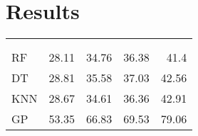 \section{Results}
\begin{margintable}
	\centering
	\begin{tabularx}{1\marginparwidth}{Xd{2.1}d{2.1}d{1.1}d{1.1}}
		\toprule
		&
		&    
		 &
		 &
		 \\
		\\
		\midrule
		RF & 28.11 & 34.76 &36.38 & 41.4 \\ 
		DT & 28.81 & 35.58 &37.03 & 42.56 \\ 
		KNN& 28.67 & 34.61 &36.36 & 42.91 \\ 
		GP & 53.35 & 66.83 &69.53 & 79.06 \\ \midrule
		

\end{tabularx}
\end{margintable}
